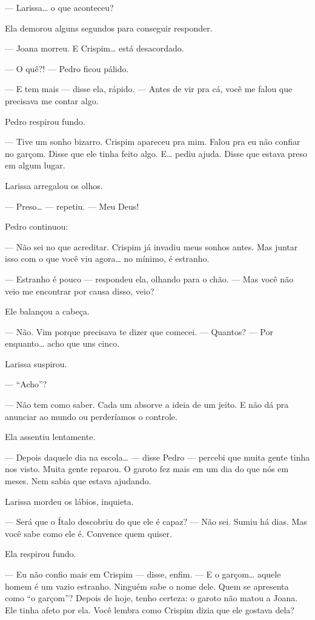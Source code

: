 — Larissa… o que aconteceu?

Ela demorou alguns segundos para conseguir responder.

— Joana morreu. E Crispim… está desacordado.

— O quê?! — Pedro ficou pálido.

— E tem mais — disse ela, rápido. — Antes de vir pra cá, você me falou que precisava me contar algo.

Pedro respirou fundo.

— Tive um sonho bizarro. Crispim apareceu pra mim. Falou pra eu não confiar no garçom. Disse que ele tinha feito algo. E… pediu ajuda. Disse que estava preso em algum lugar.

Larissa arregalou os olhos.

— Preso… — repetiu. — Meu Deus!

Pedro continuou:

— Não sei no que acreditar. Crispim já invadiu meus sonhos antes. Mas juntar isso com o que você viu agora… no mínimo, é estranho.

— Estranho é pouco — respondeu ela, olhando para o chão. — Mas você não veio me encontrar por causa disso, veio?

Ele balançou a cabeça.

— Não. Vim porque precisava te dizer que comecei.  
— Quantos?  
— Por enquanto… acho que uns cinco.

Larissa suspirou.

— “Acho”?

— Não tem como saber. Cada um absorve a ideia de um jeito. E não dá pra anunciar ao mundo ou perderíamos o controle.

Ela assentiu lentamente.

— Depois daquele dia na escola… — disse Pedro — percebi que muita gente tinha nos visto. Muita gente reparou.  
O garoto fez mais em um dia do que nós em meses.  
Nem sabia que estava ajudando.

Larissa mordeu os lábios, inquieta.

— Será que o Ítalo descobriu do que ele é capaz?  
— Não sei. Sumiu há dias. Mas você sabe como ele é. Convence quem quiser.

Ela respirou fundo.

— Eu não confio mais em Crispim — disse, enfim. — E o garçom… aquele homem é um vazio estranho. Ninguém sabe o nome dele. Quem se apresenta como “o garçom”?  
Depois de hoje, tenho certeza: o garoto não matou a Joana. Ele tinha afeto por ela. Você lembra como Crispim dizia que ele gostava dela?

